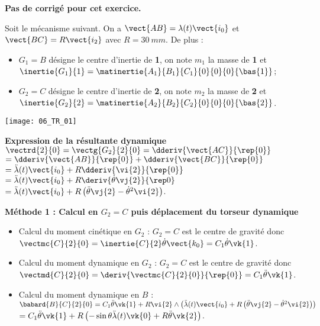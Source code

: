 \normaltrue
\correctionfalse


\setcounter{numques}{0}
\ifcorrection
\else
\textbf{Pas de corrigé pour cet exercice.}
\fi

\ifprof
\else
Soit le mécanisme suivant. On a $\vect{AB}=\lambda(t)\vect{i_0}$ et $\vect{BC}=R\vect{i_2}$ avec $R=\SI{30}{mm}$.
De plus :
\begin{itemize}
\item $G_1=B$ désigne le centre d'inertie de \textbf{1}, on note $m_1$ la masse de \textbf{1} et $\inertie{G_1}{1}=\matinertie{A_1}{B_1}{C_1}{0}{0}{0}{\bas{1}}$; 
\item $G_2=C$ désigne le centre d'inertie de \textbf{2}, on note $m_2$ la masse de \textbf{2} et $\inertie{G_2}{2}=\matinertie{A_2}{B_2}{C_2}{0}{0}{0}{\bas{2}}$.
\end{itemize}
\begin{center}
\texttt{[image: 06\_TR\_01]}
\end{center}
\fi

\ifprof

\textbf{Expression de la résultante dynamique}
$\vectrd{2}{0}=\vectg{G_2}{2}{0} = \dderiv{\vect{AC}}{\rep{0}}$ $= \dderiv{\vect{AB}}{\rep{0}}+\dderiv{\vect{BC}}{\rep{0}}$
$= \ddot{\lambda}(t) \vect{i_0} + R \dderiv{\vi{2}}{\rep{0}}$
$= \ddot{\lambda}(t) \vect{i_0} + R \deriv{\dot{\theta} \vj{2}}{\rep0}$
$= \ddot{\lambda}(t) \vect{i_0} + R \left(\ddot{\theta} \vj{2} - \dot{\theta}^2 \vi{2}\right) $.



\textbf{Méthode 1 : Calcul en $G_2=C$ puis déplacement du torseur dynamique}
\begin{itemize}
\item Calcul du moment cinétique en $G_2$ : $G_2=C$ est le centre de gravité donc $\vectmc{C}{2}{0}=\inertie{C}{2}\dot{\theta}\vect{k_0} = C_1  \dot{\theta} \vk{1}$.
\item Calcul du moment dynamique en $G_2$ : $G_2=C$ est le centre de gravité donc $\vectmd{C}{2}{0}=\deriv{\vectmc{C}{2}{0}}{\rep{0}}= C_1  \ddot{\theta} \vk{1}$.
\item Calcul du moment dynamique en $B$ : $\babard{B}{C}{2}{0} = C_1  \ddot{\theta} \vk{1} + R\vi{2}\wedge\left(  \ddot{\lambda}(t) \vect{i_0} + R \left(\ddot{\theta} \vj{2} - \dot{\theta}^2 \vi{2}\right)\right)$
$= C_1  \ddot{\theta} \vk{1} + R\left( -\sin \theta \ddot{\lambda}(t) \vk{0} + R \ddot{\theta} \vk{2}\right)$.
\end{itemize}

